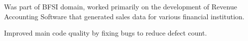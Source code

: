 \documentclass[]{kushal-resume}
\begin{document}
\begin{minipage}[t]{0.66\textwidth}
\begin{tightemize}
\item Was part of BFSI domain, worked primarily on the development of Revenue Accounting Software that generated
 sales data for various financial institution. 
 \item Improved main code quality by fixing bugs to reduce defect count.
\end{tightemize}
\sectionsep


\end{minipage} 
\end{document}
